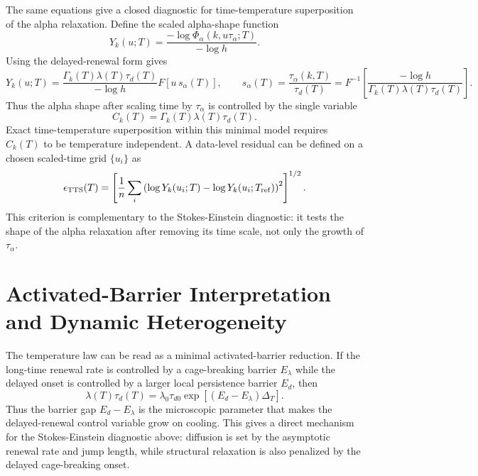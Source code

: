 \documentclass[aps,preprint,onecolumn,superscriptaddress,nofootinbib]{revtex4-2}
\begin{document}
The same equations give a closed diagnostic for time-temperature
superposition of the alpha relaxation. Define the scaled alpha-shape function
\begin{equation}
  Y_k(u;T)=
  \frac{-\log\Phi_\alpha(k,u\tau_\alpha;T)}{-\log h}.
\end{equation}
Using the delayed-renewal form gives
\begin{equation}
  Y_k(u;T)=
  \frac{\Gamma_k(T)\lambda(T)\tau_d(T)}
       {-\log h}
  F\left[u\,s_\alpha(T)\right],
  \qquad
  s_\alpha(T)=\frac{\tau_\alpha(k,T)}{\tau_d(T)}
  =
  F^{-1}\left[
    \frac{-\log h}{\Gamma_k(T)\lambda(T)\tau_d(T)}
  \right].
\end{equation}
Thus the alpha shape after scaling time by $\tau_\alpha$ is controlled by the
single variable
\begin{equation}
  C_k(T)=\Gamma_k(T)\lambda(T)\tau_d(T).
\end{equation}
Exact time-temperature superposition within this minimal model requires
$C_k(T)$ to be temperature independent. A data-level residual can be defined on
a chosen scaled-time grid $\{u_i\}$ as
\begin{equation}
  \epsilon_{\rm TTS}(T)=
  \left[
    \frac{1}{n}\sum_i
    \left(
      \log Y_k(u_i;T)-\log Y_k(u_i;T_{\rm ref})
    \right)^2
  \right]^{1/2}.
\end{equation}
This criterion is complementary to the Stokes-Einstein diagnostic: it tests the
shape of the alpha relaxation after removing its time scale, not only the
growth of $\tau_\alpha$.

\section{Activated-Barrier Interpretation and Dynamic Heterogeneity}

The temperature law can be read as a minimal activated-barrier reduction. If
the long-time renewal rate is controlled by a cage-breaking barrier
$E_\lambda$ while the delayed onset is controlled by a larger local persistence
barrier $E_d$, then
\begin{equation}
  \lambda(T)\tau_d(T)
  =\lambda_0\tau_{d0}\exp[(E_d-E_\lambda)\Delta_T].
\end{equation}
Thus the barrier gap $E_d-E_\lambda$ is the microscopic parameter that makes
the delayed-renewal control variable grow on cooling. This gives a direct
mechanism for the Stokes-Einstein diagnostic above: diffusion is set by the
asymptotic renewal rate and jump length, while structural relaxation is also
penalized by the delayed cage-breaking onset.
\end{document}
